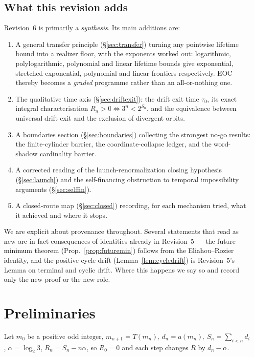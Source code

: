 \documentclass[11pt]{article}
\theoremstyle{plain}
\theoremstyle{definition}
\theoremstyle{remark}
\newcommand{\al}{\alpha}
\begin{document}
\subsection{What this revision adds}

Revision~6 is primarily a \emph{synthesis}. Its main additions are:

\begin{enumerate}[leftmargin=1.6em]
\item A general transfer principle (\S\ref{sec:transfer}) turning any pointwise lifetime bound into
  a realizer floor, with the exponents worked out: logarithmic, polylogarithmic, polynomial and
  linear lifetime bounds give exponential, stretched-exponential, polynomial and linear frontiers
  respectively. EOC thereby becomes a \emph{graded} programme rather than an all-or-nothing one.
\item The qualitative time axis (\S\ref{sec:driftexit}): the drift exit time $\tau_0$, its exact
  integral characterisation $R_n>0\iff 3^n<2^{S_n}$, and the equivalence between universal drift
  exit and the exclusion of divergent orbits.
\item A boundaries section (\S\ref{sec:boundaries}) collecting the strongest no-go results: the
  finite-cylinder barrier, the coordinate-collapse ledger, and the word-shadow cardinality barrier.
\item A corrected reading of the launch-renormalization closing hypothesis (\S\ref{sec:launch}) and
  the self-financing obstruction to temporal impossibility arguments (\S\ref{sec:selffin}).
\item A closed-route map (\S\ref{sec:closed}) recording, for each mechanism tried, what it achieved
  and where it stops.
\end{enumerate}

We are explicit about provenance throughout. Several statements that read as new are in fact
consequences of identities already in Revision~5 --- the future-minimum theorem
(Prop.~\ref{prop:futuremin}) follows from the Eliahou--Rozier identity, and the positive cycle
drift (Lemma~\ref{lem:cycledrift}) is Revision~5's Lemma on terminal and cyclic drift. Where this
happens we say so and record only the new proof or the new role.

\section{Preliminaries}\label{sec:prelim}

Let $m_0$ be a positive odd integer, $m_{n+1}=T(m_n)$, $d_n=a(m_n)$, $S_n=\sum_{i<n}d_i$,
$\al=\log_2 3$, $R_n=S_n-n\al$, so $R_0=0$ and each step changes $R$ by $d_n-\al$.
\end{document}
